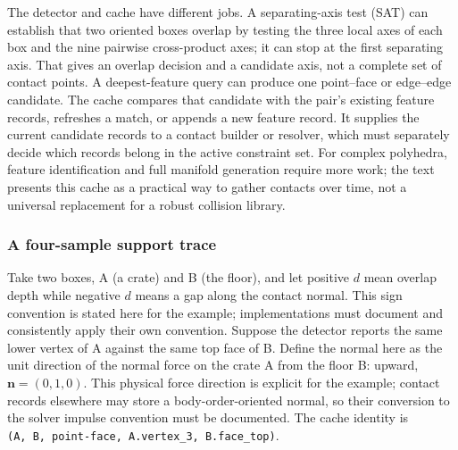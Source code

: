 The detector and cache have different jobs. A separating-axis test (SAT) can establish that two oriented boxes overlap by testing the three local axes of each box and the nine pairwise cross-product axes; it can stop at the first separating axis. That gives an overlap decision and a candidate axis, not a complete set of contact points. A deepest-feature query can produce one point--face or edge--edge candidate. The cache compares that candidate with the pair's existing feature records, refreshes a match, or appends a new feature record. It supplies the current candidate records to a contact builder or resolver, which must separately decide which records belong in the active constraint set. For complex polyhedra, feature identification and full manifold generation require more work; the text presents this cache as a practical way to gather contacts over time, not a universal replacement for a robust collision library.

\subsubsection{A four-sample support trace}\label{06-engine-ii-ch033-a-four-sample-support-trace}

Take two boxes, A (a crate) and B (the floor), and let positive \(d\) mean overlap depth while negative \(d\) means a gap along the contact normal. This sign convention is stated here for the example; implementations must document and consistently apply their own convention. Suppose the detector reports the same lower vertex of A against the same top face of B. Define the normal here as the unit direction of the normal force on the crate A from the floor B: upward, \(\mathbf n=(0,1,0)\). This physical force direction is explicit for the example; contact records elsewhere may store a body-order-oriented normal, so their conversion to the solver impulse convention must be documented. The cache identity is \texttt{(A,\ B,\ point-face,\ A.vertex\_3,\ B.face\_top)}.

